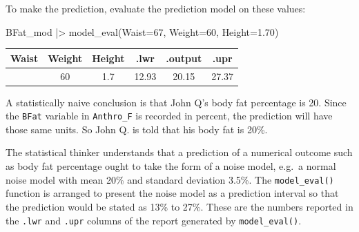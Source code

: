 \documentclass[
  letterpaper,
  DIV=11,
  numbers=noendperiod,
  oneside]{scrartcl}
\newenvironment{Shaded}{\begin{snugshade}}{\end{snugshade}}
\newcommand{\AttributeTok}[1]{\textcolor[rgb]{0.40,0.45,0.13}{#1}}
\newcommand{\DecValTok}[1]{\textcolor[rgb]{0.68,0.00,0.00}{#1}}
\newcommand{\FloatTok}[1]{\textcolor[rgb]{0.68,0.00,0.00}{#1}}
\newcommand{\FunctionTok}[1]{\textcolor[rgb]{0.28,0.35,0.67}{#1}}
\newcommand{\NormalTok}[1]{\textcolor[rgb]{0.00,0.23,0.31}{#1}}
\newcommand{\SpecialCharTok}[1]{\textcolor[rgb]{0.37,0.37,0.37}{#1}}
\begin{document}
To make the prediction, evaluate the prediction model on these values:

\begin{Shaded}
\begin{Highlighting}[]
\NormalTok{BFat\_mod }\SpecialCharTok{|\textgreater{}} \FunctionTok{model\_eval}\NormalTok{(}\AttributeTok{Waist=}\DecValTok{67}\NormalTok{, }\AttributeTok{Weight=}\DecValTok{60}\NormalTok{, }\AttributeTok{Height=}\FloatTok{1.70}\NormalTok{)}
\end{Highlighting}
\end{Shaded}

\begin{longtable}[]{@{}cccccc@{}}
\toprule\noalign{}
Waist & Weight & Height & .lwr & .output & .upr \\
\midrule\noalign{}
\endhead
\bottomrule\noalign{}
\endlastfoot
67 & 60 & 1.7 & 12.93 & 20.15 & 27.37 \\
\end{longtable}

A statistically naive conclusion is that John Q's body fat percentage is
20. Since the \texttt{BFat} variable in \texttt{Anthro\_F} is recorded
in percent, the prediction will have those same units. So John Q. is
told that his body fat is 20\%.

The statistical thinker understands that a prediction of a numerical
outcome such as body fat percentage ought to take the form of a noise
model, e.g.~a normal noise model with mean 20\% and standard deviation
3.5\%. The \texttt{model\_eval()} function is arranged to present the
noise model as a prediction interval so that the prediction would be
stated as 13\% to 27\%. These are the numbers reported in the
\texttt{.lwr} and \texttt{.upr} columns of the report generated by
\texttt{model\_eval()}.
\end{document}
